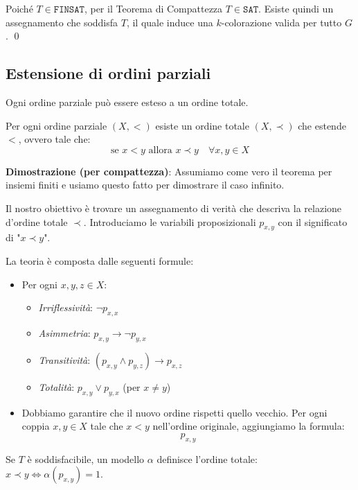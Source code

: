 \documentclass[a4paper,11pt]{report}
\newcommand{\SAT}{\texttt{SAT}}
\newcommand{\FINSAT}{\texttt{FINSAT}}
\begin{document}
Poiché \( T \in \FINSAT \), per il Teorema di Compattezza \( T \in \SAT \). Esiste quindi un assegnamento che soddisfa \( T \), il quale induce una \( k \)-colorazione valida per tutto \( G \). \qed

\subsection*{Estensione di ordini parziali}
Ogni ordine parziale può essere esteso a un ordine totale.

\begin{thmframe}{}{}
Per ogni ordine parziale \( (X, <) \) esiste un ordine totale \( (X, \prec) \) che estende \( < \), ovvero tale che:
\[ \text{se } x < y \text{ allora } x \prec y \quad \forall x,y \in X \]
\end{thmframe}

\textbf{Dimostrazione (per compattezza)}:
Assumiamo come vero il teorema per insiemi finiti e usiamo questo fatto per dimostrare il caso infinito.

Il nostro obiettivo è trovare un assegnamento di verità che descriva la relazione d'ordine totale \( \prec \). Introduciamo le variabili proposizionali \( p_{x,y} \) con il significato di "\( x \prec y \)".

La teoria è composta dalle seguenti formule:
\begin{itemize}
    \item Per ogni \( x, y, z \in X \):
        \begin{itemize}
            \item \textit{Irriﬂessività}: \( \neg p_{x,x} \)
            \item \textit{Asimmetria}: \( p_{x,y} \to \neg p_{y,x} \)
            \item \textit{Transitività}: \( (p_{x,y} \land p_{y,z}) \to p_{x,z} \)
            \item \textit{Totalità}: \( p_{x,y} \lor p_{y,x} \) (per \( x \neq y \))
        \end{itemize}
    \item Dobbiamo garantire che il nuovo ordine rispetti quello vecchio. Per ogni coppia \( x, y \in X \) tale che \( x < y \) nell'ordine originale, aggiungiamo la formula:
    \[ p_{x,y} \]
\end{itemize}

Se \( T \) è soddisfacibile, un modello \( \alpha \) definisce l'ordine totale: \( x \prec y \iff \alpha(p_{x,y})=1 \).
\end{document}
